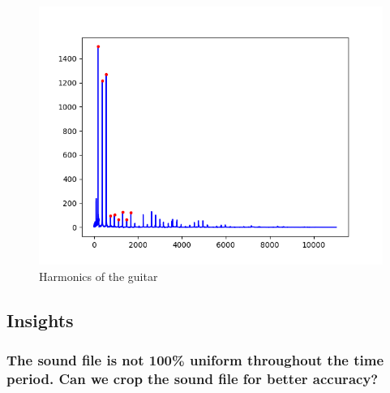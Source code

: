 \documentclass{article}
\begin{document}
\begin{figure}[!htbp]
    \centering
    \includegraphics[scale=0.7]{guitar-harmonics.png}
    \caption{Harmonics of the guitar}
    \label{fig:my_label}
\end{figure}


\subsection{Insights}

\subsubsection{The sound file is not 100\% uniform throughout the time period. Can we crop the sound file for better accuracy?}
\end{document}
